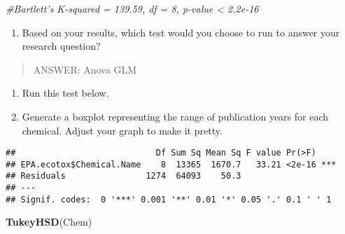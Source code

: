 \documentclass[]{article}
\newenvironment{Shaded}{\begin{snugshade}}{\end{snugshade}}
\newcommand{\KeywordTok}[1]{\textcolor[rgb]{0.13,0.29,0.53}{\textbf{#1}}}
\newcommand{\StringTok}[1]{\textcolor[rgb]{0.31,0.60,0.02}{#1}}
\newcommand{\CommentTok}[1]{\textcolor[rgb]{0.56,0.35,0.01}{\textit{#1}}}
\newcommand{\OperatorTok}[1]{\textcolor[rgb]{0.81,0.36,0.00}{\textbf{#1}}}
\newcommand{\NormalTok}[1]{#1}
\providecommand{\tightlist}{%
  \setlength{\itemsep}{0pt}\setlength{\parskip}{0pt}}
\begin{document}
\begin{Shaded}
\begin{Highlighting}[]
\CommentTok{#Bartlett's K-squared = 139.59, df = 8, p-value < 2.2e-16}
\end{Highlighting}
\end{Shaded}

\begin{enumerate}
\def\labelenumi{\arabic{enumi}.}
\setcounter{enumi}{5}
\tightlist
\item
  Based on your results, which test would you choose to run to answer
  your research question?
\end{enumerate}

\begin{quote}
ANSWER: Anova GLM
\end{quote}

\begin{enumerate}
\def\labelenumi{\arabic{enumi}.}
\setcounter{enumi}{6}
\item
  Run this test below.
\item
  Generate a boxplot representing the range of publication years for
  each chemical. Adjust your graph to make it pretty.
\end{enumerate}

\begin{Shaded}
\end{Shaded}

\begin{verbatim}
##                            Df Sum Sq Mean Sq F value Pr(>F)    
## EPA.ecotox$Chemical.Name    8  13365  1670.7   33.21 <2e-16 ***
## Residuals                1274  64093    50.3                   
## ---
## Signif. codes:  0 '***' 0.001 '**' 0.01 '*' 0.05 '.' 0.1 ' ' 1
\end{verbatim}

\begin{Shaded}
\begin{Highlighting}[]
\KeywordTok{TukeyHSD}\NormalTok{(Chem)}
\end{Highlighting}
\end{Shaded}
\end{document}
